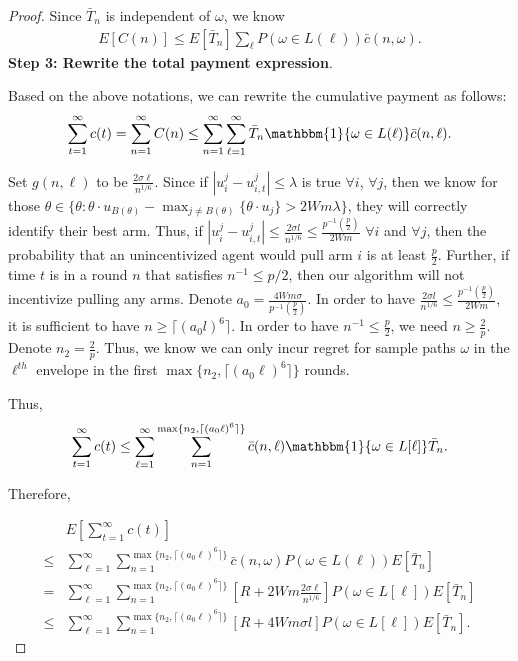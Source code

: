 \begin{proof}
Since $\bar{T}_{n}$ is independent of $\omega$, we know
\begin{align}
E[C(n)]\leq E[\bar{T}_{n}]\sum_{\ell}P(\omega\in L(\ell))\bar{c}(n,\omega). \nonumber
\end{align}
\noindent\textbf{Step 3: Rewrite the total payment expression}.

Based on the above notations, we can rewrite the cumulative payment as follows:
\begin{align}
\sum_{t=1}^{\infty}c(t) =\sum_{n=1}^{\infty}C(n)
\leq  \sum_{n=1}^{\infty}\sum_{\ell=1}^{\infty}\bar{T}_{n}\mathbbm{1}\{\omega\in L(\ell)\}\bar{c}(n,\ell). \nonumber
\end{align}

Set $g(n,\ell)$ to be $\frac{2\sigma \ell}{n^{1/6}}$. Since if $|u_{i}^{j}-u_{i,t}^{j}|\leq \lambda$ is true $\forall i$, $\forall j$, then we know for those $\theta\in \{\theta:\theta\cdot u_{B(\theta)}-\max_{j\neq B(\theta)}\{\theta \cdot u_{j}\}> 2Wm\lambda\}$, they will correctly identify their best arm. Thus, if $|u_{i}^{j}-u_{i,t}^{j}|\leq \frac{2\sigma l}{n^{1/6}} \leq \frac{p^{-1}(\frac{p}{2})}{2Wm}$ $\forall i$ and $\forall j$, then the probability that an unincentivized agent would pull arm $i$ is at least $\frac{p}{2}$. Further, if time $t$ is in a round $n$ that satisfies $n^{-1}\leq p/2$, then our algorithm will not incentivize pulling any arms. Denote $a_0=\frac{4Wm\sigma}{p^{-1}(\frac{p}{2})}$. In order to have $\frac{2\sigma l}{n^{1/6}}\leq \frac{p^{-1}(\frac{p}{2})}{2Wm}$, it is sufficient to have $n\geq \lceil (a_{0} l)^6 \rceil$. In order to have $n^{-1}\leq \frac{p}{2}$, we need $n\geq \frac{2}{p}$. Denote $n_2=\frac{2}{p}$. Thus, we know we can only incur regret for sample paths $\omega$ in the $\ell^{th}$ envelope in the first $\max\{n_2,\lceil (a_0 \ell)^6 \rceil\}$ rounds.

Thus,
\begin{align}
\sum_{t=1}^{\infty}c(t)\leq\sum_{\ell=1}^{\infty}\sum_{n=1}^{\max\{n_2,\lceil (a_0 \ell)^6 \rceil\}}\bar{c}(n,\ell)\mathbbm{1}\{\omega\in L[\ell]\}\bar{T}_{n}. \nonumber
\end{align}

Therefore,

\begin{align}
&E\left[\sum_{t=1}^{\infty}c(t)\right] \nonumber\\
\leq &\sum_{\ell=1}^{\infty}\sum_{n=1}^{\max\{n_2,\lceil (a_0 \ell)^6 \rceil\}}\bar{c}(n,\omega)P(\omega \in L(\ell))E[\bar{T}_{n}] \nonumber \\
=&\sum_{\ell=1}^{\infty}\sum_{n=1}^{\max\{n_2,\lceil (a_0 \ell)^6 \rceil\}}\left[R+2Wm\frac{2\sigma \ell}{n^{1/6}}\right]P(\omega\in L[\ell])E[\bar{T}_{n}] \nonumber \\
\leq &\sum_{\ell=1}^{\infty}\sum_{n=1}^{\max\{n_2,\lceil (a_0 \ell)^6 \rceil\}}\left[R+4Wm\sigma l\right]P(\omega\in L[\ell])E[\bar{T}_{n}]. \nonumber
\end{align}


\end{proof}
